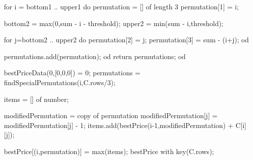 \documentclass[paper=a4, fontsize=11pt]{scrartcl} %
\numberwithin{equation}{section} %
\numberwithin{figure}{section} %
\numberwithin{table}{section} %
\begin{document}
	for i = bottom1 .. upper1 do
		permutation = [] of length 3
		permutation[1] = i;
		
		bottom2 = max(0,sum - i - threshold);
		upper2 = min(sum - i,threshold);
		
		for j=bottom2 .. upper2 do
			permutation[2] = j;
			permutation[3] = sum - (i+j);
		od
		
		
		permutations.add(permutation);
	od	
	return permutations;
od




\begin{algorithmic}[1]
	bestPriceData(0,[0,0,0]) = 0;
        \State permutations = findSpecialPermutations(i,C.rows/3);
		
	items = [] of number;
		
            
                \State modifiedPermutation = copy of permutation
		    \State modifiedPermutation[j] = modifiedPermutation[j] - 1;
		    items.add(bestPrice(i-1,modifiedPermutation) + C[i][j]);
                 \EndIf
            \EndFor			
		
            \State bestPrice[(i,permutation)] = max(items);		
        \EndFor
    \EndFor
    \State \Return bestPrice with key(C.rows);
\EndFunction
\end{algorithmic}
\end{document}
